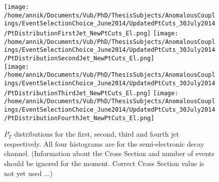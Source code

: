\documentclass[a4paper,12pt]{report}
\begin{document}
\begin{figure}[!h]
\texttt{[image: /home/annik/Documents/Vub/PhD/ThesisSubjects/AnomalousCouplings/EventSelectionChoice\_June2014/UpdatedPtCuts\_30July2014/PtDistributionFirstJet\_NewPtCuts\_El.png]}
\texttt{[image: /home/annik/Documents/Vub/PhD/ThesisSubjects/AnomalousCouplings/EventSelectionChoice\_June2014/UpdatedPtCuts\_30July2014/PtDistributionSecondJet\_NewPtCuts\_El.png]}\\
\texttt{[image: /home/annik/Documents/Vub/PhD/ThesisSubjects/AnomalousCouplings/EventSelectionChoice\_June2014/UpdatedPtCuts\_30July2014/PtDistributionThirdJet\_NewPtCuts\_El.png]}
\texttt{[image: /home/annik/Documents/Vub/PhD/ThesisSubjects/AnomalousCouplings/EventSelectionChoice\_June2014/UpdatedPtCuts\_30July2014/PtDistributionFourthJet\_NewPtCuts\_El.png]}
\caption{$P_T$ distributions for the first, second, third and fourth jet respectively. All four histograms are for the semi-electronic decay channel. (Information about the Cross Section and number of events should be ignored for the moment. Correct Cross Section value is not yet used ...) }
\end{figure}
\end{document}
